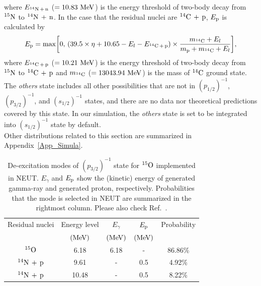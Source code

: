 where $E_{^{14}{\rm N}\,+\,{\rm n}}$ ($=10.83~{\rm MeV}$) is the energy threshold of two-body decay from $^{15}{\rm N}$ to $^{14}{\rm N}\,+\,{\rm n}$.
In the case that the residual nuclei are $^{14}{\rm C}\,+\,{\rm p}$, $E_{{\rm p}}$ is calculated by
\begin{eqnarray}\label{Ep_14Cp}
	E_{{\rm p}} = {\rm max}\bigg[0,\,(39.5 \times \eta + 10.65 - E_{l} - E_{^{14}{\rm C}\,+\,{\rm p}}) \times {m_{^{14}{\rm C}} + E_{l} \over m_{{\rm p}} + m_{^{14}{\rm C}} + E_{l}}\bigg],
\end{eqnarray}
where $E_{^{14}{\rm C}\,+\,{\rm p}}$ ($=10.21~{\rm MeV}$) is the energy threshold of two-body decay from $^{15}{\rm N}$ to $^{14}{\rm C}\,+\,{\rm p}$ and $m_{^{14}{\rm C}}$ ($=13043.94~{\rm MeV}$) is the mass of $^{14}{\rm C}$ ground state.
The \textit{others} state includes all other possibilities that are not in $(p_{1/2})^{-1}$, $(p_{3/2})^{-1}$, and $(s_{1/2})^{-1}$ states, and there are no data nor theoretical predictions covered by this state.
In our simulation, the \textit{others} state is set to be integrated into $(s_{1/2})^{-1}$ state by default.\\
\hs
Other distributions related to this section are summarized in Appendix~\ref{App_Simula}.

\begin{table}[H]
	\centering
	\caption[De-excitation modes of $(p_{3/2})^{-1}$ state for $^{15}{\rm O}$ implemented in NEUT]{
	De-excitation modes of $(p_{3/2})^{-1}$ state for $^{15}{\rm O}$ implemented in NEUT.
	$E_{\gamma}$ and $E_{{\rm p}}$ show the (kinetic) energy of generated gamma-ray and generated proton, respectively.
	Probabilities that the mode is selected in NEUT are summarized in the rightmost column.
	Please also check Ref.~\cite{1994Leuschner,1991Ajzenberg}.
	}\label{deex_p3_2_O}
	\vs
	\begin{tabular}{ccccc} \hline \hline
		Residual nuclei            & Energy level  & $E_{\gamma}$  & $E_{{\rm p}}$ & Probability \\
		                           & $({\rm MeV})$ & $({\rm MeV})$ & $({\rm MeV})$ &             \\ \hline
		$^{15}{\rm O}$             & 6.18          & 6.18          & -             & 86.86\%     \\
		$^{14}{\rm N}\,+\,{\rm p}$ & 9.61          & -             & 0.5           & 4.92\%      \\
		$^{14}{\rm N}\,+\,{\rm p}$ & 10.48         & -             & 0.5           & 8.22\%      \\ \hline \hline
	\end{tabular}
\end{table}

